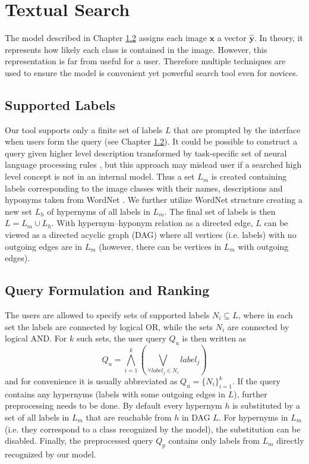 \chapter{Textual Search}

The model described in Chapter \ref{} assigns each image $\bm{x}$ a vector $\bm{\hat{y}}$. In theory, it represents how likely each class is contained in the image. However, this representation is far from useful for a user. Therefore multiple techniques are used to ensure the model is convenient yet powerful search tool even for novices.

\section{Supported Labels}
Our tool supports only a finite set of labels $L$ that are prompted by the interface when users form the query (see Chapter \ref{}). It could be possible to construct a query given higher level description transformed by task-specific set of neural language processing rules \cite{moumtzidou2017verge}, but this approach may mislead user if a searched high level concept is not in an internal model. Thus a set $L_m$ is created containing labels corresponding to the image classes with their \textsf{names}, \textsf{descriptions} and \textsf{hyponyms} taken from WordNet \cite{WordNet}. We further utilize WordNet structure creating a new set $L_h$ of hypernyms of all labels in $L_m$. The final set of labels is then $L=L_m\cup L_h$. With hypernym--hyponym relation as a directed edge, $L$ can be viewed as a directed acyclic graph (DAG) where all vertices (i.e. labels) with no outgoing edges are in $L_m$ (however, there can be vertices in $L_m$ with outgoing edges).

\section{Query Formulation and Ranking}
The users are allowed to specify sets of supported labels $N_i \subseteq L$, where in each set the labels are connected by logical \textsf{OR}, while the sets $N_i$ are connected by logical \textsf{AND}. For $k$ such sets, the user query $Q_u$ is then written as
\begin{equation}
	Q_u=\bigwedge\limits_{i=1}^k\left(\bigvee\limits_{\forall label_j\in N_i} label_j \right)
\end{equation}
and for convenience it is usually abbreviated as $Q_u=\{N_i\}_{i=1}^k$. If the query contains any hypernyms (labels with some outgoing edges in $L$), further preprocessing needs to be done. By default every hypernym $h$ is substituted by a set of all labels in $L_m$ that are reachable from $h$ in DAG $L$. For hypernyms in $L_m$ (i.e. they correspond to a class recognized by the model), the substitution can be disabled. Finally, the preprocessed query $Q_p$ contains only labels from $L_m$ directly recognized by our model.

